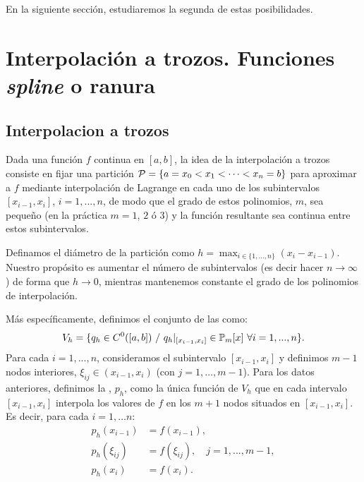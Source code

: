  En la siguiente sección, estudiaremos la segunda de estas
 posibilidades.

 \section{Interpolación a trozos. Funciones \textit{spline} o ranura}
 \label{sec:interp-trozos-splines}

 \subsection{Interpolacion a trozos}
 \label{sec:interpolacion-trozos}


 Dada una función $f$ continua en $[a,b]$, la idea de la interpolación
 a trozos consiste en fijar una partición ${\cal
   P}=\{a=x_0<x_1<\cdots<x_n=b\}$ para aproximar a $f$ mediante
 interpolación de Lagrange en cada uno de los subintervalos
 $[x_{i-1},x_{i}]$, $i=1,...,n$, de modo que el grado de estos
 polinomios, $m$, sea pequeño (en la práctica $m=1$, $2$ ó $3$) y la
 función resultante sea continua entre estos subintervalos.

 Definamos el diámetro de la partición como
 $h=\max_{i\in\{1,...,n\}}(x_i-x_{i-1})$. Nuestro propósito es aumentar
 el número de subintervalos (es decir hacer $n\to \infty$) de forma
 que $h\to 0$, mientras mantenemos constante el grado de los polinomios
 de interpolación.

 Más específicamente, definimos el conjunto de las  como:
 \begin{equation*}
   V_h = \{ q_h\in C^0([a,b]) \ /\ q_h|_{[x_{i-1},x_{i}]}\in \Pol_m[x]\
   \forall i=1,...,n \}.
 \end{equation*}
 Para cada $i=1,...,n$, consideramos el subintervalo $[x_{i-1},x_i]$ y
 definimos $m-1$ nodos interiores, $\xi_{ij}\in (x_{i-1},x_i)$ (con
 $j=1,\dots,m-1$). Para los datos anteriores, definimos la
 , $p_h$, como
 la única función de $V_h$ que en cada intervalo $[x_{i-1},x_i]$
 interpola los valores de $f$ en los $m+1$ nodos situados en $[x_{i-1},
 x_{i}]$.  Es decir, para cada $i=1,\dots n$:
 \begin{align*}
   p_h(x_{i-1})&=f(x_{i-1}),\\
   p_h(\xi_{ij})&=f(\xi_{ij}), \quad j=1,...,m-1,\\
   p_h(x_i)&=f(x_i).
 \end{align*}


